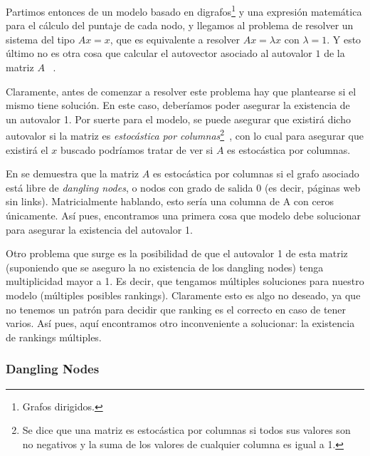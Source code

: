 \par Partimos entonces de un modelo basado en digrafos\footnote{Grafos
dirigidos.} y una expresi\'on matem\'atica para el c\'alculo del puntaje de cada
nodo, y llegamos al problema de resolver un sistema del tipo $Ax = x$, que es
equivalente a resolver $Ax = \lambda x$ con $\lambda = 1$. Y esto \'ultimo no es
otra cosa que calcular el autovector asociado al autovalor $1$ de la matriz $A$
~\cite[p.~443]{Burden2010}.

\par Claramente, antes de comenzar a resolver este problema hay que plantearse
si el mismo tiene soluci\'on. En este caso, deber\'iamos poder asegurar la
existencia de un autovalor 1. Por suerte para el modelo, se puede asegurar que
existir\'a dicho autovalor si la matriz es \emph{estoc\'astica por
columnas}\footnote{Se dice que una matriz es estoc\'astica por columnas si todos
sus valores son no negativos y la suma de los valores de cualquier columna es
igual a 1.}~\cite[p.572]{Bryan2006}, con lo cual para asegurar que existir\'a el
$x$ buscado podr\'iamos tratar de ver si $A$ es estoc\'astica por
columnas.

\par En \cite[p.572]{Bryan2006} se demuestra que la matriz $A$ es estoc\'astica
por columnas si el grafo asociado est\'a libre de \emph{dangling nodes}, o
nodos con grado de salida 0 (es decir, p\'aginas web sin links). Matricialmente
hablando, esto ser\'ia una columna de A con ceros \'unicamente. As\'i pues,
encontramos una primera cosa que modelo debe solucionar para asegurar la
existencia del autovalor 1.

\par Otro problema que surge es la posibilidad de que el autovalor 1 de esta
matriz (suponiendo que se aseguro la no existencia de los dangling nodes) tenga
multiplicidad mayor a 1. Es decir, que tengamos m\'ultiples soluciones para
nuestro modelo (m\'ultiples posibles rankings). Claramente esto es algo no
deseado, ya que no tenemos un patr\'on para decidir que ranking es el correcto
en caso de tener varios. As\'i pues, aqu\'i encontramos otro inconveniente a
solucionar: la existencia de rankings m\'ultiples.


\subsubsection{Dangling Nodes}\label{subsubsec:dang_nodes}

